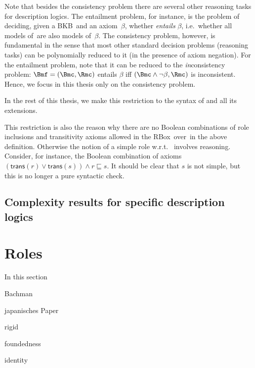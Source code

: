 Note that besides the consistency problem there are several other reasoning tasks for description
logics.  The entailment problem, for instance, is the problem of deciding, given a BKB~\Bmf and an
axiom~$\beta$, whether \Bmf \emph{entails} $\beta$, i.e.~whether all models of~\Bmf are also models
of~$\beta$.
%
The consistency problem, however, is fundamental in the sense that most other standard decision
problems (reasoning tasks) can be polynomially reduced to it (in the presence of axiom negation).
For the entailment problem, note that it can be reduced to the \emph{in}consistency problem: $\Bmf=(\B,\Rmc)$
entails $\beta$ iff $(\B\land\lnot\beta,\Rmc)$ is inconsistent.  Hence, we focus in this thesis only
on the consistency problem.





In the rest of this thesis, we make this restriction to the syntax of \SHQ and all its
extensions.

This restriction is also the reason why there are no Boolean combinations of
role inclusions and transitivity axioms allowed in the RBox~\Rmc over~\Nsig in
the above definition.  Otherwise the notion of a simple role w.r.t.~\Rmc
involves reasoning.  Consider, for instance, the Boolean combination of axioms
$(\mathsf{trans}(r)\lor\mathsf{trans}(s))\land r\sqsubseteq s$.  It should be
clear that $s$ is not simple, but this is no longer a pure syntactic check.


\begin{example}
  
\end{example}

\subsection{Complexity results for specific description logics}
\label{sec:compl-results-spec}


\clearpage

\section{Roles}
\label{sec:rosiroles}

In this section 

Bachman

japanisches Paper

rigid

foundedness

identity




